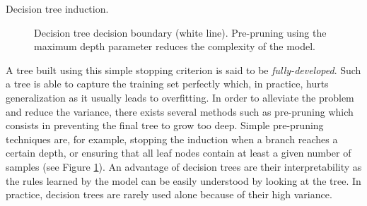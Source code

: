 \begin{algorithm}[t]
  \SetAlgoLined

  \;
\caption{Decision tree induction.}
\label{algo:backml:dtinduction}
\end{algorithm}

\begin{figure}
  \centering
  \caption{Decision tree decision boundary (white line). Pre-pruning using the maximum depth parameter reduces the complexity of the model.}
  \label{fig:backml:dt_boundary}
\end{figure}

A tree built using this simple stopping criterion is said to be \textit{fully-developed}.
Such a tree is able to capture the training set perfectly which, in practice,
hurts generalization as it usually leads to overfitting. In order to alleviate
the problem and reduce the variance, there exists several methods such as pre-pruning
which consists in preventing the final tree to grow too deep. Simple pre-pruning
techniques are, for example, stopping the induction when a branch reaches a certain
depth, or ensuring that all leaf nodes contain at least a given number of samples
(see Figure \ref{fig:backml:dt_boundary}). An advantage of decision trees are
their interpretability as the rules learned by the model can be easily understood
by looking at the tree. In practice, decision trees are rarely used alone because
of their high variance.

